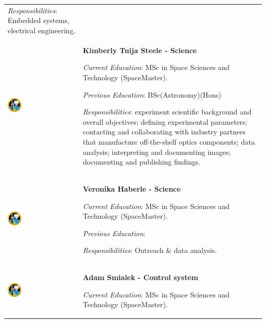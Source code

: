 \begin{longtable}[]{m{} m{}}
\smallskip
\textit{Responsibilities}: Embedded systems, electrical engineering.
\bigskip
\\
 \includegraphics[width=0.2\textwidth]{0-cover/img/logo-rexus-bexus.png}  & \textbf{Kimberly Tuija Steele - Science}

\smallskip
\textit{Current Education}: MSc in Space Sciences and Technology (SpaceMaster).

\smallskip
\textit{Previous Education}: BSc(Astronomy)(Hons)

\smallskip
\textit{Responsibilities}: experiment scientific background and overall objectives; defining experimental parameters; contacting and collaborating with industry partners that manufacture off-the-shelf optics components; data analysis; interpreting and documenting images; documenting and publishing findings.

\bigskip
\\
 \includegraphics[width=0.2\textwidth]{0-cover/img/logo-rexus-bexus.png}  & \textbf{Veronika Haberle - Science}

\smallskip
\textit{Current Education}: MSc in Space Sciences and Technology (SpaceMaster).

\smallskip
\textit{Previous Education}:

\smallskip
\textit{Responsibilities}: Outreach \& data analysis.
\bigskip
\\
 \includegraphics[width=0.2\textwidth]{0-cover/img/logo-rexus-bexus.png}  & \textbf{Adam Smialek - Control system}

\smallskip
\textit{Current Education}: MSc in Space Sciences and Technology (SpaceMaster).


\end{longtable}
